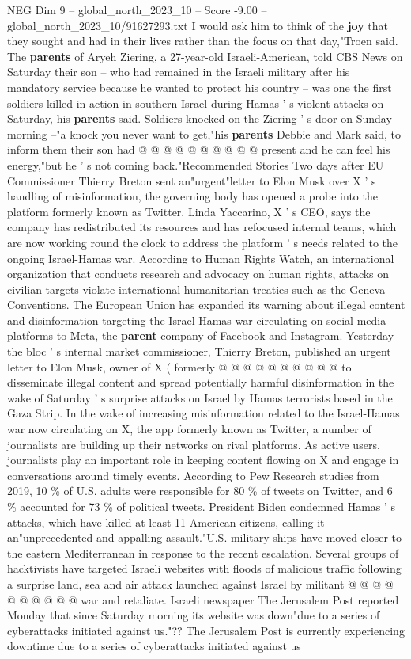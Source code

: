 \begin{textsample}{NEG Dim 9 – global\_north\_2023\_10 – Score -9.00 – global\_north\_2023\_10/91627293.txt}
I would ask him to think of the \textbf{joy} that they sought and had in their lives rather than the focus on that day,"Troen said.
The \textbf{parents} of Aryeh Ziering, a 27-year-old Israeli-American, told CBS News on Saturday their son -- who had remained in the Israeli military after his mandatory service because he wanted to protect his country -- was one the first soldiers killed in action in southern Israel during Hamas ' s violent attacks on Saturday, his \textbf{parents} said.
Soldiers knocked on the Ziering ' s door on Sunday morning --"a knock you never want to get,"his \textbf{parents} Debbie and Mark said, to inform them their son had @ @ @ @ @ @ @ @ @ @ present and he can feel his energy,"but he ' s not coming back."Recommended Stories Two days after EU Commissioner Thierry Breton sent an"urgent"letter to Elon Musk over X ' s handling of misinformation, the governing body has opened a probe into the platform formerly known as Twitter.
Linda Yaccarino, X ' s CEO, says the company has redistributed its resources and has refocused internal teams, which are now working round the clock to address the platform ' s needs related to the ongoing Israel-Hamas war.
According to Human Rights Watch, an international organization that conducts research and advocacy on human rights, attacks on civilian targets violate international humanitarian treaties such as the Geneva Conventions.
The European Union has expanded its warning about illegal content and disinformation targeting the Israel-Hamas war circulating on social media platforms to Meta, the \textbf{parent} company of Facebook and Instagram.
Yesterday the bloc ' s internal market commissioner, Thierry Breton, published an urgent letter to Elon Musk, owner of X ( formerly @ @ @ @ @ @ @ @ @ @ to disseminate illegal content and spread potentially harmful disinformation in the wake of Saturday ' s surprise attacks on Israel by Hamas terrorists based in the Gaza Strip.
In the wake of increasing misinformation related to the Israel-Hamas war now circulating on X, the app formerly known as Twitter, a number of journalists are building up their networks on rival platforms.
As active users, journalists play an important role in keeping content flowing on X and engage in conversations around timely events.
According to Pew Research studies from 2019, 10 \% of U.S. adults were responsible for 80 \% of tweets on Twitter, and 6 \% accounted for 73 \% of political tweets.
President Biden condemned Hamas ' s attacks, which have killed at least 11 American citizens, calling it an"unprecedented and appalling assault."U.S. military ships have moved closer to the eastern Mediterranean in response to the recent escalation.
Several groups of hacktivists have targeted Israeli websites with floods of malicious traffic following a surprise land, sea and air attack launched against Israel by militant @ @ @ @ @ @ @ @ @ @ war and retaliate.
Israeli newspaper The Jerusalem Post reported Monday that since Saturday morning its website was down"due to a series of cyberattacks initiated against us."??
The Jerusalem Post is currently experiencing downtime due to a series of cyberattacks initiated against us


\end{textsample}
